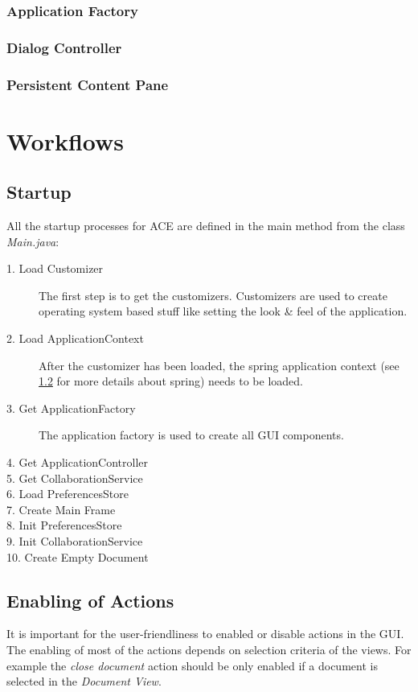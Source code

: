 \subsubsection{Application Factory}
\label{applicationlayer_applicationfactory}
\subsubsection{Dialog Controller}
\subsubsection{Persistent Content Pane}



\newpage
\section{Workflows}

\subsection{Startup}
All the startup processes for ACE are defined in the main method from the class \textit{Main.java}:
\begin{description}
\item[1. Load Customizer ] The first step is to get the customizers. Customizers are used to create operating system based stuff like setting the look \& feel of the application.
\item[2. Load ApplicationContext ] After the customizer has been loaded, the spring application context (see \ref{} for more details about spring) needs to be loaded.
\item[3. Get ApplicationFactory ] The application factory is used to create all GUI components.
\item[4. Get ApplicationController ]  
\item[5. Get CollaborationService ] 
\item[6. Load PreferencesStore ]
\item[7. Create Main Frame ]
\item[8. Init PreferencesStore ]
\item[9. Init CollaborationService ]
\item[10. Create Empty Document ]
\end{description}

\subsection{Enabling of Actions}
It is important for the user-friendliness to enabled or disable actions in the GUI. The enabling of most of the actions depends on selection criteria of the views. For example the \textit{close document} action should be only enabled if a document is selected in the \textit{Document View}.

